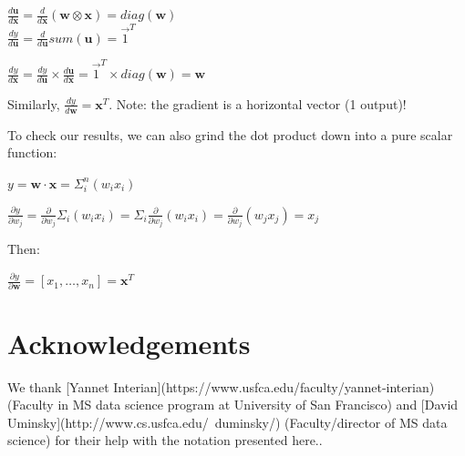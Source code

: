 \documentclass[11pt]{article}
\begin{document}
$\frac{d \mathbf{u}}{d\mathbf{x}} = \frac{d}{d\mathbf{x}} (\mathbf{w} \otimes \mathbf{x}) = diag(\mathbf{w})$\\
$\frac{dy}{d\mathbf{u}} = \frac{d}{d\mathbf{u}} sum(\mathbf{u}) = \vec{1}^T$

$\frac{dy}{d\mathbf{x}} = \frac{dy}{d\mathbf{u}} \times \frac{d\mathbf{u}}{d\mathbf{x}} = \vec{1}^T \times diag(\mathbf{w}) = \mathbf{w}$

Similarly, $\frac{dy}{d\mathbf{w}} = \mathbf{x}^T$. Note: the gradient is a horizontal vector (1 output)!

To check our results, we can also grind the dot product down into a pure scalar function:

$y = \mathbf{w} \cdot \mathbf{x} = \Sigma_i^n (w_i x_i)$

$\frac{\partial y}{\partial w_j} = \frac{\partial}{\partial w_j} \Sigma_i (w_i x_i) = \Sigma_i \frac{\partial}{\partial w_j} (w_i x_i) = \frac{\partial}{\partial w_j} (w_j x_j) = x_j$

Then:

$\frac{\partial y}{\partial \mathbf{w}} = [ x_1, \ldots, x_n ] = \mathbf{x}^T$

\section{Acknowledgements}

We thank [Yannet Interian](https://www.usfca.edu/faculty/yannet-interian) (Faculty in MS data science program at University of San Francisco) and [David Uminsky](http://www.cs.usfca.edu/~duminsky/) (Faculty/director of MS data science) for their help with the notation presented here..
\end{document}
